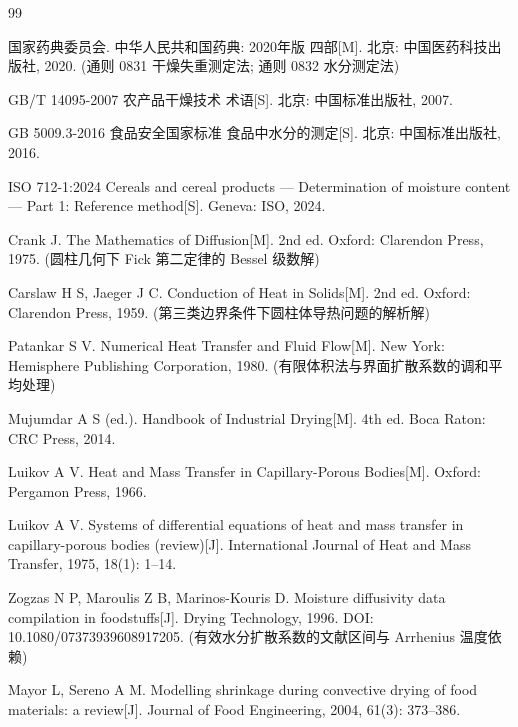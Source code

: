 \begin{thebibliography}{99}
\small

国家药典委员会. 中华人民共和国药典: 2020年版 四部[M]. 北京: 中国医药科技出版社, 2020.
(通则 0831 干燥失重测定法; 通则 0832 水分测定法)

GB/T 14095-2007 农产品干燥技术 术语[S]. 北京: 中国标准出版社, 2007.

GB 5009.3-2016 食品安全国家标准 食品中水分的测定[S]. 北京: 中国标准出版社, 2016.

ISO 712-1:2024 Cereals and cereal products --- Determination of moisture content ---
Part 1: Reference method[S]. Geneva: ISO, 2024.

Crank J. The Mathematics of Diffusion[M]. 2nd ed. Oxford: Clarendon Press, 1975.
(圆柱几何下 Fick 第二定律的 Bessel 级数解)

Carslaw H S, Jaeger J C. Conduction of Heat in Solids[M]. 2nd ed.
Oxford: Clarendon Press, 1959. (第三类边界条件下圆柱体导热问题的解析解)

Patankar S V. Numerical Heat Transfer and Fluid Flow[M]. New York:
Hemisphere Publishing Corporation, 1980. (有限体积法与界面扩散系数的调和平均处理)

Mujumdar A S (ed.). Handbook of Industrial Drying[M]. 4th ed. Boca Raton:
CRC Press, 2014.

Luikov A V. Heat and Mass Transfer in Capillary-Porous Bodies[M].
Oxford: Pergamon Press, 1966.

Luikov A V. Systems of differential equations of heat and mass transfer in
capillary-porous bodies (review)[J]. International Journal of Heat and Mass
Transfer, 1975, 18(1): 1--14.

Zogzas N P, Maroulis Z B, Marinos-Kouris D. Moisture diffusivity data
compilation in foodstuffs[J]. Drying Technology, 1996.
DOI: 10.1080/07373939608917205. (有效水分扩散系数的文献区间与 Arrhenius 温度依赖)

Mayor L, Sereno A M. Modelling shrinkage during convective drying of food
materials: a review[J]. Journal of Food Engineering, 2004, 61(3): 373--386.


\end{thebibliography}
